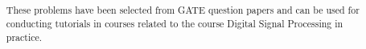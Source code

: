 \documentclass[journal,12pt,twocolumn]{IEEEtran}
\begin{document}
\providecommand{\qfunc}[1]{\ensuremath{Q\left(#1\right)}}
\providecommand{\sbrak}[1]{\ensuremath{{}\left[#1\right]}}
\providecommand{\lsbrak}[1]{\ensuremath{{}\left[#1\right.}}
\providecommand{\rsbrak}[1]{\ensuremath{{}\left.#1\right]}}
\providecommand{\brak}[1]{\ensuremath{\left(#1\right)}}
\providecommand{\lbrak}[1]{\ensuremath{\left(#1\right.}}
\providecommand{\rbrak}[1]{\ensuremath{\left.#1\right)}}
\providecommand{\cbrak}[1]{\ensuremath{\left\{#1\right\}}}
\providecommand{\lcbrak}[1]{\ensuremath{\left\{#1\right.}}
\providecommand{\rcbrak}[1]{\ensuremath{\left.#1\right\}}}

\title{
}


\begin{abstract}
These problems have been selected from
GATE question papers and can be used for conducting
tutorials in courses related to the course Digital Signal Processing in practice.
\end{abstract}
\end{document}

